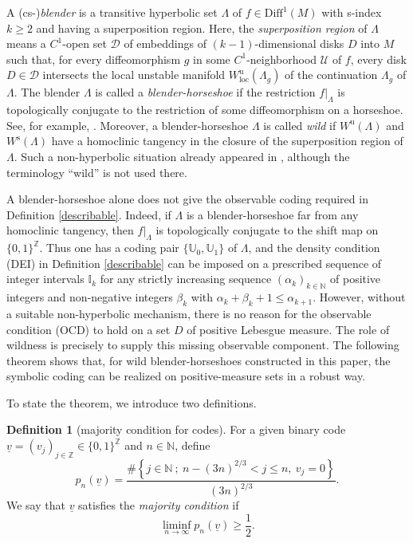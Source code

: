 \documentclass{amsart}
\theoremstyle{definition}
\newtheorem{dfn}[thm]{Definition}
\numberwithin{equation}{section}
\numberwithin{figure}{section}
\def\smfd{W^{\mathrm{s}}}
\def\umfd{W^{\mathrm{u}}}
\def\lumfd{W^{\mathrm{u}}_{\mathrm{loc}}}
\begin{document}
A (cs-)\emph{blender} is a transitive hyperbolic set $\Lambda$ of 
$f\in \mathrm{Diff}^{1}(M)$ with s-index $k\geq 2$ and having a superposition region. 
Here, the \emph{superposition region} of $\Lambda$ means a $C^{1}$-open set $\mathcal{D}$ of embeddings of $(k-1)$-dimensional disks $D$ into $M$ such that, for every diffeomorphism $g$ in some $C^{1}$-neighborhood $\mathcal{U}$ of $f$, every disk $D\in \mathcal{D}$ intersects the local unstable manifold $\lumfd(\Lambda_{g})$ of the continuation $\Lambda_{g}$ of $\Lambda$.
The blender $\Lambda$ is called a \emph{blender-horseshoe} if the restriction $f|_{\Lambda}$ is topologically conjugate to the restriction of some diffeomorphism on a horseshoe. 
See, for example, \cite{BD96,BD12}. 
Moreover, a blender-horseshoe $\Lambda$ is called \emph{wild} if $\umfd(\Lambda)$ and $\smfd(\Lambda)$ have a homoclinic tangency in the closure of the superposition region of $\Lambda$. 
Such a non-hyperbolic situation already appeared in \cite{BD12}, although the terminology ``wild'' is not used there.

A blender-horseshoe alone does not give the observable coding required in Definition \ref{describable}. 
Indeed, if $\Lambda$ is a blender-horseshoe far from any homoclinic tangency, then $f|_{\Lambda}$ is topologically conjugate to the shift map on $\{0,1\}^{\mathbb{Z}}$. 
Thus one has a coding pair $\{\mathbb U_0,\mathbb U_1\}$ of $\Lambda$, and the density condition (DEI) in Definition \ref{describable} can be imposed on a prescribed sequence of integer intervals $\mathbb I_k$ for any strictly increasing sequence $(\alpha_k)_{k\in\mathbb N}$ of positive integers and non-negative integers $\beta_k$ with $\alpha_k+\beta_k+1\leq \alpha_{k+1}$. 
However, without a suitable non-hyperbolic mechanism, there is no reason for the observable condition (OCD) to hold on a set $D$ of positive Lebesgue measure. 
The role of wildness is precisely to supply this missing observable component. 
The following theorem shows that, for wild blender-horseshoes constructed in this paper, the symbolic coding can be realized on positive-measure sets in a robust way.

To state the theorem, we introduce two definitions.

\begin{dfn}[majority condition for codes]\label{m-cnd}
For a given binary code $\underline{v}=(v_{j})_{j\in\mathbb{Z}}\in \{0,1\}^{\mathbb{Z}}$ and $n\in \mathbb{N}$, define
\begin{equation}\label{eqn_pnv}
p_{n}(\underline{v})=\frac{
\#\left\{
j\in \mathbb{N}\ ;\ 
n-(3n)^{2/3}< j\leq n,\ 
v_{j}=0
\right\}
}{(3n)^{2/3}}.
\end{equation}
We say that $\underline{v}$ satisfies the \emph{majority condition} if
\[
\liminf_{n\rightarrow \infty}p_{n}(\underline{v})\geq \frac{1}{2}.
\]
\end{dfn}
\end{document}
